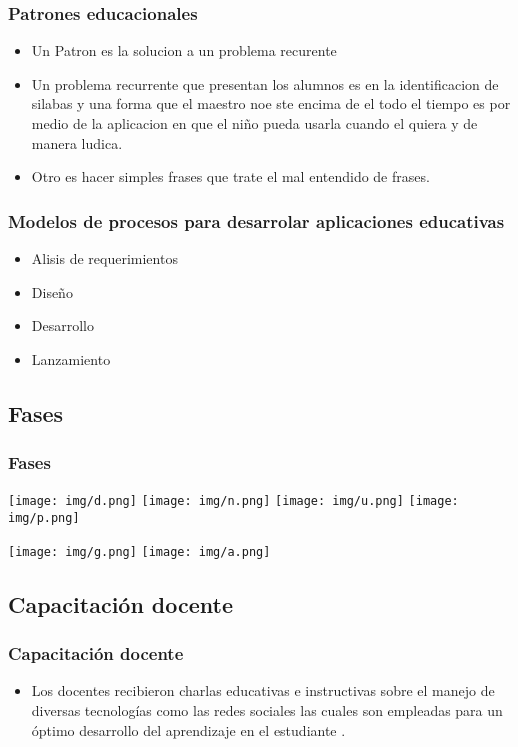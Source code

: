 \documentclass[11pt]{beamer}
\begin{document}
\begin{frame}
\frametitle{Patrones educacionales}
\begin{itemize}
\item Un Patron es la solucion a un problema recurente
\item  Un problema recurrente que presentan los alumnos es en la identificacion de silabas y una forma que el maestro noe ste encima de el todo el tiempo es por medio de la aplicacion en que el niño pueda usarla cuando el quiera y de manera ludica.
\item Otro es hacer simples frases que trate el mal entendido de frases.

\end{itemize}
\end{frame}
\begin{frame}
\frametitle{Modelos de procesos para desarrolar aplicaciones educativas}
\begin{itemize}
\item Alisis de requerimientos
\item Diseño
\item Desarrollo
\item Lanzamiento


\end{itemize}
\end{frame}

\begin{frame}
\section{Fases}
\frametitle{Fases}
{\texttt{[image: img/d.png]}}
{\texttt{[image: img/n.png]}}
{\texttt{[image: img/u.png]}}
{\texttt{[image: img/p.png]}}
\end{frame}

\begin{frame}
{\texttt{[image: img/g.png]}}
{\texttt{[image: img/a.png]}}
\end{frame}

\begin{frame}
\section{Capacitación docente}
\frametitle{Capacitación docente}
\begin{itemize}
\item Los docentes recibieron charlas educativas e instructivas sobre el manejo de diversas tecnologías como las redes sociales las cuales son  empleadas para un óptimo desarrollo del aprendizaje en el estudiante .
\end{itemize}
\end{frame}
\end{document}
